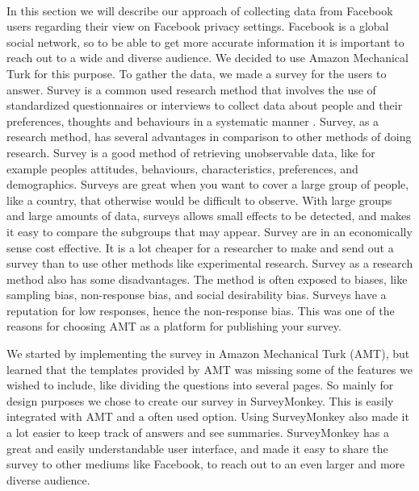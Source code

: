 \paragraph{}
In this section we will describe our approach of collecting data from Facebook users regarding their view on Facebook privacy settings. Facebook is a global social network, so to be able to get more accurate information it is important to reach out to a wide and diverse audience. We decided to use Amazon Mechanical Turk for this purpose. To gather the data, we made a survey for the users to answer. Survey is a common used research method that involves the use of standardized questionnaires or interviews to collect data about people and their preferences, thoughts and behaviours in a systematic manner \cite{survey}. Survey, as a research method, has several advantages in comparison to other methods of doing research. Survey is a good method of retrieving unobservable data, like for example peoples attitudes, behaviours, characteristics, preferences, and demographics. Surveys are great when you want to cover a large group of people, like a country, that otherwise would be difficult to observe. With large groups and large amounts of data, surveys allows small effects to be detected, and makes it easy to compare the subgroups that may appear. Survey are in an economically sense cost effective. It is a lot cheaper for a researcher to make and send out a survey than to use other methods like experimental research. Survey as a research method also has some disadvantages. The method is often exposed to biases, like sampling bias, non-response bias, and social desirability bias. Surveys have a reputation for low responses, hence the non-response bias. This was one of the reasons for choosing AMT as a platform for publishing your survey. 

We started by implementing the survey in Amazon Mechanical Turk (AMT), but learned that the templates provided by AMT was missing some of the features we wished to include, like dividing the questions into several pages. So mainly for design purposes we chose to create our survey in SurveyMonkey. This is easily integrated with AMT and a often used option.  Using SurveyMonkey also made it a lot easier to keep track of answers and see summaries. SurveyMonkey has a great and easily understandable user interface, and made it easy to share the survey to other mediums like Facebook, to reach out to an even larger and more diverse audience. 


